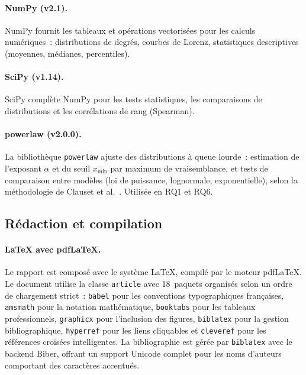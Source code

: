 \paragraph{NumPy (v2.1).}
NumPy fournit les tableaux et op\'erations vectoris\'ees pour les calculs
num\'eriques~: distributions de degr\'es, courbes de Lorenz, statistiques
descriptives (moyennes, m\'edianes, percentiles).

\paragraph{SciPy (v1.14).}
SciPy compl\`ete NumPy pour les tests statistiques, les comparaisons de
distributions et les corr\'elations de rang (Spearman).

\paragraph{powerlaw (v2.0.0).}
La biblioth\`eque \texttt{powerlaw} ajuste des distributions \`a queue
lourde~: estimation de l'exposant $\alpha$ et du seuil $x_{\min}$ par
maximum de vraisemblance, et tests de comparaison entre mod\`eles (loi de
puissance, lognormale, exponentielle), selon la m\'ethodologie de Clauset
et al.~\cite{clauset2009powerlaw}. Utilis\'ee en RQ1 et RQ6.

\subsection{R\'edaction et compilation}

\paragraph{\LaTeX{} avec pdf\LaTeX{}.}
Le rapport est compos\'e avec le syst\`eme \LaTeX{}, compil\'e par le moteur
pdf\LaTeX{}. Le document utilise la classe \texttt{article} avec 18~paquets
organis\'es selon un ordre de chargement strict~: \texttt{babel} pour les
conventions typographiques fran\c{c}aises, \texttt{amsmath} pour la notation
math\'ematique, \texttt{booktabs} pour les tableaux professionnels,
\texttt{graphicx} pour l'inclusion des figures, \texttt{biblatex} pour la
gestion bibliographique, \texttt{hyperref} pour les liens cliquables et
\texttt{cleveref} pour les r\'ef\'erences crois\'ees intelligentes. La
bibliographie est g\'er\'ee par \texttt{biblatex} avec le backend Biber,
offrant un support Unicode complet pour les noms d'auteurs comportant des
caract\`eres accentu\'es.
